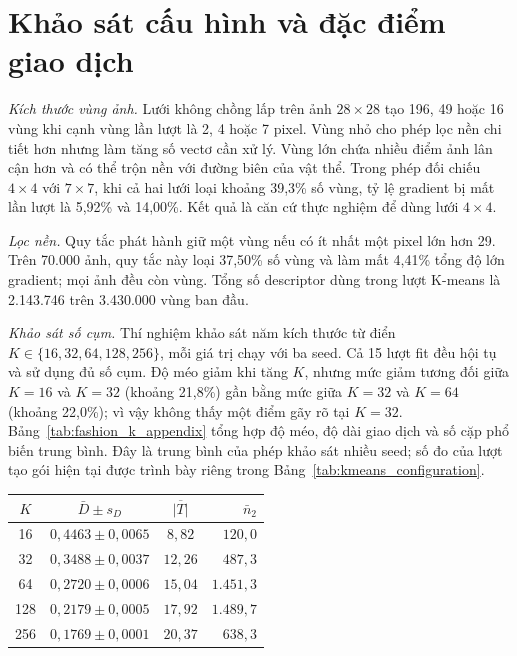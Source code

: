 \clearpage
\appendices

\section{Khảo sát cấu hình và đặc điểm giao dịch}
\label{app:fashion_configuration}

\textit{Kích thước vùng ảnh.}
Lưới không chồng lấp trên ảnh $28\times28$ tạo 196, 49 hoặc 16 vùng khi cạnh vùng lần lượt là 2, 4 hoặc 7 pixel. Vùng nhỏ cho phép lọc nền chi tiết hơn nhưng làm tăng số vectơ cần xử lý. Vùng lớn chứa nhiều điểm ảnh lân cận hơn và có thể trộn nền với đường biên của vật thể. Trong phép đối chiếu $4\times4$ với $7\times7$, khi cả hai lưới loại khoảng 39,3\% số vùng, tỷ lệ gradient bị mất lần lượt là 5,92\% và 14,00\%. Kết quả là căn cứ thực nghiệm để dùng lưới $4\times4$.

\textit{Lọc nền.}
Quy tắc phát hành giữ một vùng nếu có ít nhất một pixel lớn hơn 29. Trên 70.000 ảnh, quy tắc này loại 37,50\% số vùng và làm mất 4,41\% tổng độ lớn gradient; mọi ảnh đều còn vùng. Tổng số descriptor dùng trong lượt K-means là 2.143.746 trên 3.430.000 vùng ban đầu.

\textit{Khảo sát số cụm.}
Thí nghiệm khảo sát năm kích thước từ điển $K\in\{16,32,64,128,256\}$, mỗi giá trị chạy với ba seed. Cả 15 lượt fit đều hội tụ và sử dụng đủ số cụm. Độ méo giảm khi tăng $K$, nhưng mức giảm tương đối giữa $K=16$ và $K=32$ (khoảng 21,8\%) gần bằng mức giữa $K=32$ và $K=64$ (khoảng 22,0\%); vì vậy không thấy một điểm gãy rõ tại $K=32$. Bảng~\ref{tab:fashion_k_appendix} tổng hợp độ méo, độ dài giao dịch và số cặp phổ biến trung bình. Đây là trung bình của phép khảo sát nhiều seed; số đo của lượt tạo gói hiện tại được trình bày riêng trong Bảng~\ref{tab:kmeans_configuration}.

\begin{center}
    \label{tab:fashion_k_appendix}
    \scriptsize
    \setlength{\tabcolsep}{2.5pt}
    \begin{tabular}{@{}c c c r@{}}
        \toprule
        $K$ & $\bar{D}\pm s_D$ & $\overline{|T|}$ & $\bar{n}_2$ \\
        \midrule
        16  & $0{,}4463\pm0{,}0065$ & $8{,}82$  & $120{,}0$ \\
        32  & $0{,}3488\pm0{,}0037$ & $12{,}26$ & $487{,}3$ \\
        64  & $0{,}2720\pm0{,}0006$ & $15{,}04$ & $1.451{,}3$ \\
        128 & $0{,}2179\pm0{,}0005$ & $17{,}92$ & $1.489{,}7$ \\
        256 & $0{,}1769\pm0{,}0001$ & $20{,}37$ & $638{,}3$ \\
        \bottomrule
    \end{tabular}
\end{center}

